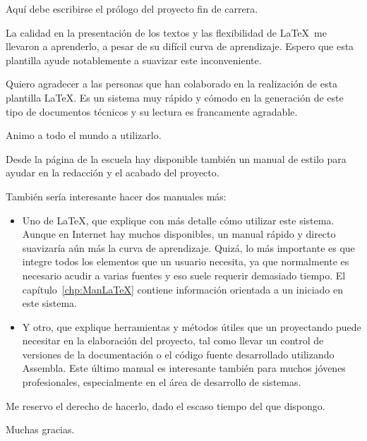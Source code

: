 
  Aquí debe escribirse el prólogo del proyecto fin de carrera.
  \medskip
  
  La calidad en la presentación de los textos y las flexibilidad de \LaTeX\ me llevaron a aprenderlo, a pesar de su difícil curva de aprendizaje.\nli
  Espero que esta plantilla ayude notablemente a suavizar este inconveniente.
  
  Quiero agradecer a las personas que han colaborado en la realización de esta plantilla \LaTeX. Es un sistema muy rápido y cómodo en la generación de este tipo de documentos técnicos y su lectura es francamente agradable.
  
  Animo a todo el mundo a utilizarlo.
  
  Desde la página de la escuela hay disponible también un manual de estilo para ayudar en la redacción y el acabado del proyecto.

  También sería interesante hacer dos manuales más: 
\begin{itemize}
  \item{Uno de \LaTeX, que explique con más detalle cómo utilizar este sistema. Aunque en Internet hay muchos disponibles, un manual rápido y directo suavizaría aún más la curva de aprendizaje.\nli
    Quizá, lo más importante es que integre todos los elementos que un usuario necesita, ya que normalmente es necesario acudir a varias fuentes y eso suele requerir demasiado tiempo.\nli
    El capítulo~\ref{chp:ManLaTeX} contiene información orientada a un iniciado en este sistema.}
  
  \item{Y otro, que explique herramientas y métodos útiles que un proyectando puede necesitar en la elaboración del proyecto, tal como llevar un control de versiones de la documentación o el código fuente desarrollado utilizando Assembla\TM. Este último manual es interesante también para muchos jóvenes profesionales, especialmente en el área de desarrollo de sistemas.}
\end{itemize}

  Me reservo el derecho de hacerlo, dado el escaso tiempo del que dispongo.
  \bigskip
  
  Muchas gracias.

\chapterend
